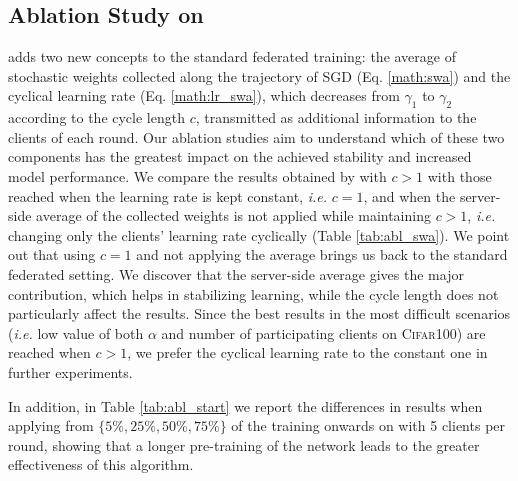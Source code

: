 \subsection{Ablation Study on \swa}
\label{app:abl_swa}
\swa adds two new concepts to the standard federated training: the average of stochastic weights collected along the trajectory of SGD (Eq. \ref{math:swa}) and the cyclical learning rate (Eq. \ref{math:lr_swa}), which decreases from $\gamma_1$ to $\gamma_2$ according to the cycle length $c$, transmitted as additional information to the clients of each round. Our ablation studies aim to understand which of these two components has the greatest impact on the achieved stability and increased model performance. We compare the results obtained by \swa with $c>1$ with those reached when the learning rate is kept constant, \textit{i.e.} $c=1$, and when the server-side average of the collected weights is not applied while maintaining $c>1$, \textit{i.e.} changing only the clients' learning rate cyclically (Table \ref{tab:abl_swa}). We point out that using $c=1$ and not applying the average brings us back to the standard federated setting. We discover that the server-side average gives the major contribution, which helps in stabilizing learning, while the cycle length does not particularly affect the results. Since the best results in the most difficult scenarios (\textit{i.e.} low value of both $\alpha$ and number of participating clients on \textsc{Cifar100}) are reached when $c>1$, we prefer the cyclical learning rate to the constant one in further experiments.

In addition, in Table \ref{tab:abl_start} we report the differences in results when applying \swa from $\{5\%, 25\%, 50\%, 75\%\}$ of the training onwards on \fedavg with 5 clients per round, showing that a longer pre-training of the network leads to the greater effectiveness of this algorithm.


